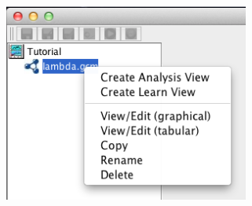 \documentclass[titlepage,11pt]{article}
\begin{document}
\begin{center}
\includegraphics[height=65mm]{screenshots/modGCM} 
\end{center}


\end{document}
